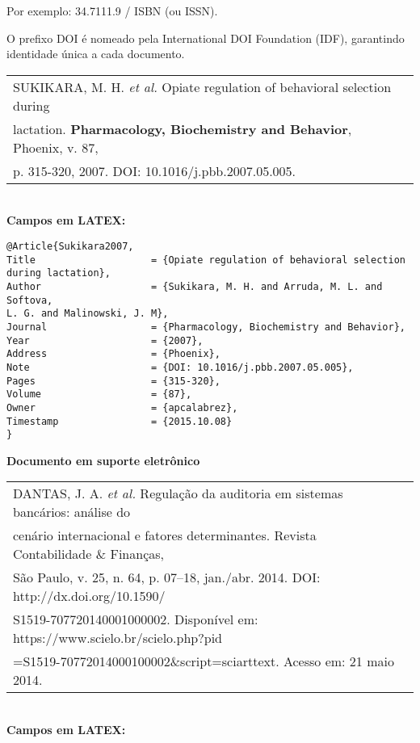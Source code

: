 Por exemplo: 34.7111.9 / ISBN (ou ISSN).

O prefixo DOI \'e nomeado pela International DOI Foundation (IDF),
garantindo identidade única a cada documento. \\


\begin{tabular}{|l|c|} \hline
	SUKIKARA, M. H. \textit{et al.} Opiate regulation of behavioral selection during \\lactation. \textbf{Pharmacology, Biochemistry and Behavior}, Phoenix, v. 87,\\ p. 315-320, 2007. DOI: 10.1016/j.pbb.2007.05.005. 
	\\\hline
\end{tabular} \\

\textbf{Campos em LATEX:} 

\begin{verbatim}
@Article{Sukikara2007,
Title                    = {Opiate regulation of behavioral selection 
during lactation},
Author                   = {Sukikara, M. H. and Arruda, M. L. and 
Softova,
L. G. and Malinowski, J. M},
Journal                  = {Pharmacology, Biochemistry and Behavior},
Year                     = {2007},
Address                  = {Phoenix},
Note                     = {DOI: 10.1016/j.pbb.2007.05.005},
Pages                    = {315-320},
Volume                   = {87},
Owner                    = {apcalabrez},
Timestamp                = {2015.10.08}
}
\end{verbatim}

\textbf{Documento em suporte eletrônico} 

\begin{tabular}{|l|c|} \hline
	DANTAS, J. A. \textit{et al.} Regulação da auditoria em sistemas banc\'arios: an\'alise do \\ cen\'ario internacional e fatores determinantes. Revista Contabilidade \& Finanças,\\ São Paulo, v. 25, n. 64, p. 07–18, jan./abr. 2014. DOI: http://dx.doi.org/10.1590/\\S1519-707720140001000002. Disponível em: https://www.scielo.br/scielo.php?pid\\=S1519-70772014000100002\&script=sciarttext. Acesso em: 21 maio 2014.	
	\\\hline
\end{tabular} \\

\textbf{Campos em LATEX:} 

